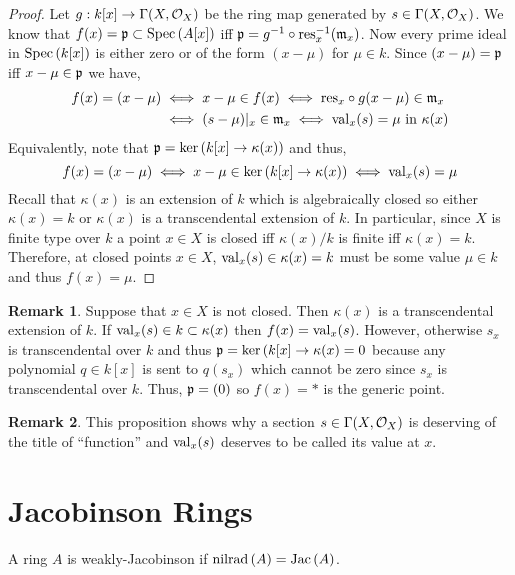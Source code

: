 \documentclass[12pt]{extarticle}
\theoremstyle{definition}
\newtheorem{remark}{Remark}
\newenvironment{definition}[1][Definition:]{\begin{trivlist}
\item[\hskip \labelsep {\bfseries #1}]}{\end{trivlist}}
\newcommand{\res}{\mathrm{res}}
\newcommand{\m}{\mathfrak{m}}
\begin{document}
\begin{proof}
Let $g : k[x] \to \Gamma(X, \mathcal{O}_{X})$ be the ring map generated by $s \in \Gamma(X, \mathcal{O}_{X})$. We know that $f(x) = \mathfrak{p} \subset \mathrm{Spec}\left(A[x]\right)$ iff $\p = g^{-1} \circ \res_x^{-1}(\m_x)$. Now every prime ideal in $\mathrm{Spec}\left(k[x]\right)$ is either zero or of the form $(x - \mu)$ for $\mu \in k$. Since $(x - \mu) = \mathfrak{p}$ iff $x - \mu \in \mathfrak{p}$ we have,
\begin{align*}
f(x) = (x - \mu) & \iff x - \mu \in f(x) \iff \res_x \circ g(x - \mu) \in \m_x
\\
&  \iff (s - \mu)|_x \in \m_x \iff \val_x(s) = \mu \text{ in } \kappa(x)
\end{align*}
Equivalently, note that $\mathfrak{p} = \ker{(k[x] \to \kappa(x))}$ and thus,
\[ f(x) = (x - \mu) \iff x - \mu \in \ker{(k[x] \to \kappa(x))} \iff \mathrm{val}_x(s) = \mu \]
Recall that $\kappa(x)$ is an extension of $k$ which is algebraically closed so either $\kappa(x) = k$ or $\kappa(x)$ is a transcendental extension of $k$. In particular, since $X$ is finite type over $k$ a point $x \in X$ is closed iff $\kappa(x) / k$ is finite iff $\kappa(x) = k$. Therefore, at closed points $x \in X$, $\mathrm{val}_x(s) \in \kappa(x) = k$ must be some value $\mu \in k$ and thus $f(x) = \mu$.
\end{proof}

\begin{remark}
Suppose that $x \in X$ is not closed. Then $\kappa(x)$ is a transcendental extension of $k$. If $\mathrm{val}_x(s) \in k \subset \kappa(x)$ then $f(x) = \mathrm{val}_x(s)$. However, otherwise $s_x$ is transcendental over $k$ and thus $\mathfrak{p} = \ker{(k[x] \to \kappa(x)} = 0$ because any polynomial $q \in k[x]$ is sent to $q(s_x)$ which cannot be zero since $s_x$ is transcendental over $k$. Thus, $\mathfrak{p} = (0)$ so $f(x) = *$ is the generic point. 
\end{remark}

\begin{remark}
This proposition shows why a section $s \in \Gamma(X, \mathcal{O}_{X})$ is deserving of the title of ``function'' and $\mathrm{val}_x(s)$ deserves to be called its value at $x$. 
\end{remark}

\section{Jacobinson Rings}

\newcommand{\nilrad}[1]{\mathrm{nilrad}\left(#1\right)}

\begin{definition}
A ring $A$ is weakly-Jacobinson if $\nilrad{A} = \Jac{A}$. 
\end{definition}
\end{document}
